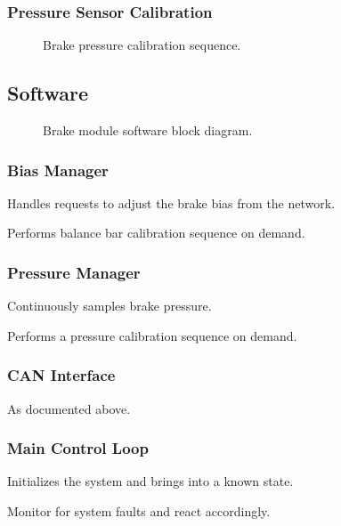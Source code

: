 \subsubsection{Pressure Sensor Calibration}

\begin{figure}
\centering

\caption{Brake pressure calibration sequence.}
\label{fig:design_brake_pressure_calibration_flow}
\end{figure}

\subsection{Software}

\begin{figure}
\centering

\caption{Brake module software block diagram.}
\label{fig:pneumatics_design}
	\end{figure}

\subsubsection{Bias Manager}

Handles requests to adjust the brake bias from the network. 

Performs balance bar calibration sequence on demand.


\subsubsection{Pressure Manager}

Continuously samples brake pressure.

Performs a pressure calibration sequence on demand.


\subsubsection{CAN Interface}

As documented above.


\subsubsection{Main Control Loop}

Initializes the system and brings into a known state.

Monitor for system faults and react accordingly.


